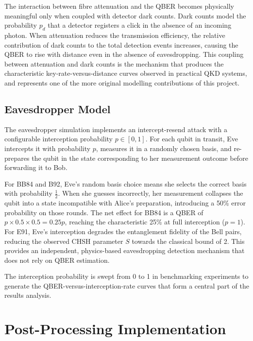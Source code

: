The interaction between fibre attenuation and the QBER becomes physically meaningful only when coupled with detector dark counts. Dark counts model the probability $p_d$ that a detector registers a click in the absence of an incoming photon. When attenuation reduces the transmission efficiency, the relative contribution of dark counts to the total detection events increases, causing the QBER to rise with distance even in the absence of eavesdropping. This coupling between attenuation and dark counts is the mechanism that produces the characteristic key-rate-versus-distance curves observed in practical QKD systems, and represents one of the more original modelling contributions of this project.

\subsection{Eavesdropper Model}

The eavesdropper simulation implements an intercept-resend attack with a configurable interception probability $p \in [0, 1]$. For each qubit in transit, Eve intercepts it with probability $p$, measures it in a randomly chosen basis, and re-prepares the qubit in the state corresponding to her measurement outcome before forwarding it to Bob.

For BB84 and B92, Eve's random basis choice means she selects the correct basis with probability $\frac{1}{2}$. When she guesses incorrectly, her measurement collapses the qubit into a state incompatible with Alice's preparation, introducing a 50\% error probability on those rounds. The net effect for BB84 is a QBER of $p \times 0.5 \times 0.5 = 0.25p$, reaching the characteristic 25\% at full interception ($p = 1$). For E91, Eve's interception degrades the entanglement fidelity of the Bell pairs, reducing the observed CHSH parameter $S$ towards the classical bound of 2. This provides an independent, physics-based eavesdropping detection mechanism that does not rely on QBER estimation.

The interception probability is swept from 0 to 1 in benchmarking experiments to generate the QBER-versus-interception-rate curves that form a central part of the results analysis.



\section{Post-Processing Implementation}

